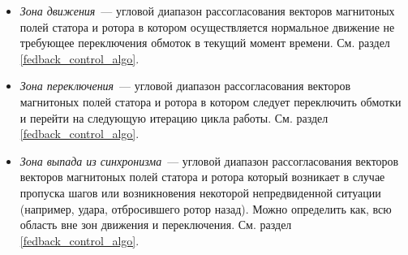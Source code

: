 \begin{itemize}
    \item \textit{Зона движения}~--- угловой диапазон рассогласования векторов
        магнитоных полей статора и ротора в котором осуществляется нормальное
        движение не требующее переключения обмоток в текущий момент времени.
        См. раздел \ref{fedback_control_algo}.

    \item \textit{Зона переключения}~--- угловой диапазон рассогласования
        векторов магнитоных полей статора и ротора в котором следует переключить
        обмотки и перейти на следующую итерацию цикла работы.
        См. раздел \ref{fedback_control_algo}.

    \item \textit{Зона выпада из синхронизма}~--- угловой диапазон
        рассогласования векторов векторов магнитоных полей статора и ротора
        который возникает в случае пропуска шагов или возникновения некоторой
        непредвиденной ситуации (например, удара, отбросившего ротор назад).
        Можно определить как, всю область вне зон движения и переключения.
        См. раздел \ref{fedback_control_algo}.

\end{itemize}
